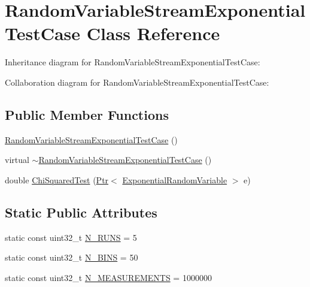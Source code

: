 \hypertarget{classRandomVariableStreamExponentialTestCase}{}\section{Random\+Variable\+Stream\+Exponential\+Test\+Case Class Reference}
\label{classRandomVariableStreamExponentialTestCase}


Inheritance diagram for Random\+Variable\+Stream\+Exponential\+Test\+Case\+:


Collaboration diagram for Random\+Variable\+Stream\+Exponential\+Test\+Case\+:
\subsection*{Public Member Functions}
\begin{DoxyCompactItemize}
\item 
\hyperlink{classRandomVariableStreamExponentialTestCase_a415a587d32705c905b5700ba326f82b4}{Random\+Variable\+Stream\+Exponential\+Test\+Case} ()
\item 
virtual \hyperlink{classRandomVariableStreamExponentialTestCase_af18721881d26f8309b56df4ba62f7d4b}{$\sim$\+Random\+Variable\+Stream\+Exponential\+Test\+Case} ()
\item 
double \hyperlink{classRandomVariableStreamExponentialTestCase_a2613351abbb33f766dd36dc2e9bfde62}{Chi\+Squared\+Test} (\hyperlink{classns3_1_1Ptr}{Ptr}$<$ \hyperlink{classns3_1_1ExponentialRandomVariable}{Exponential\+Random\+Variable} $>$ e)
\end{DoxyCompactItemize}
\subsection*{Static Public Attributes}
\begin{DoxyCompactItemize}
\item 
static const uint32\+\_\+t \hyperlink{classRandomVariableStreamExponentialTestCase_a069ef5f86a9882cdd7cc6c4c281825ee}{N\+\_\+\+R\+U\+NS} = 5
\item 
static const uint32\+\_\+t \hyperlink{classRandomVariableStreamExponentialTestCase_acc59b9e97c80683bdc06ffe237ab5339}{N\+\_\+\+B\+I\+NS} = 50
\item 
static const uint32\+\_\+t \hyperlink{classRandomVariableStreamExponentialTestCase_ade203b10972a628c493cc521e58a0e49}{N\+\_\+\+M\+E\+A\+S\+U\+R\+E\+M\+E\+N\+TS} = 1000000
\end{DoxyCompactItemize}
